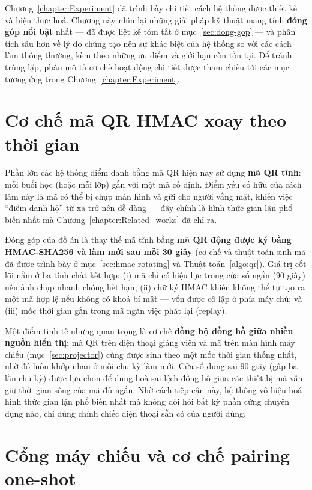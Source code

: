 \documentclass[../main.tex]{subfiles}
\begin{document}
Chương~\ref{chapter:Experiment} đã trình bày chi tiết cách hệ thống được thiết kế và hiện
thực hoá. Chương này nhìn lại những giải pháp kỹ thuật mang tính \textbf{đóng góp nổi bật}
nhất --- đã được liệt kê tóm tắt ở mục~\ref{sec:dong-gop} --- và phân tích sâu hơn về lý do
chúng tạo nên sự khác biệt của hệ thống so với các cách làm thông thường, kèm theo những ưu
điểm và giới hạn còn tồn tại. Để tránh trùng lặp, phần mô tả cơ chế hoạt động chi tiết được
tham chiếu tới các mục tương ứng trong Chương~\ref{chapter:Experiment}.

\section{Cơ chế mã QR HMAC xoay theo thời gian}
\label{sec:dg-qr}

Phần lớn các hệ thống điểm danh bằng mã QR hiện nay sử dụng \textbf{mã QR tĩnh}: mỗi buổi học
(hoặc mỗi lớp) gắn với một mã cố định. Điểm yếu cố hữu của cách làm này là mã có thể bị chụp
màn hình và gửi cho người vắng mặt, khiến việc ``điểm danh hộ'' từ xa trở nên dễ dàng --- đây
chính là hình thức gian lận phổ biến nhất mà Chương~\ref{chapter:Related_works} đã chỉ ra.

Đóng góp của đồ án là thay thế mã tĩnh bằng \textbf{mã QR động được ký bằng HMAC-SHA256 và làm
mới sau mỗi 30 giây} (cơ chế và thuật toán sinh mã đã được trình bày ở
mục~\ref{sec:hmac-rotating} và Thuật toán~\ref{algo:qr}). Giá trị cốt lõi nằm ở ba tính chất
kết hợp: (i) mã chỉ có hiệu lực trong cửa sổ ngắn (90 giây) nên ảnh chụp nhanh chóng hết hạn;
(ii) chữ ký HMAC khiến không thể tự tạo ra một mã hợp lệ nếu không có khoá bí mật --- vốn được
cô lập ở phía máy chủ; và (iii) mốc thời gian gắn trong mã ngăn việc phát lại (replay).

Một điểm tinh tế nhưng quan trọng là cơ chế \textbf{đồng bộ đồng hồ giữa nhiều nguồn hiển thị}:
mã QR trên điện thoại giảng viên và mã trên màn hình máy chiếu (mục~\ref{sec:projector}) cùng
được sinh theo một mốc thời gian thống nhất, nhờ đó luôn khớp nhau ở mỗi chu kỳ làm mới. Cửa
sổ dung sai 90 giây (gấp ba lần chu kỳ) được lựa chọn để dung hoà sai lệch đồng hồ giữa các
thiết bị mà vẫn giữ thời gian sống của mã đủ ngắn. Nhờ cách tiếp cận này, hệ thống vô hiệu hoá
hình thức gian lận phổ biến nhất mà không đòi hỏi bất kỳ phần cứng chuyên dụng nào, chỉ dùng
chính chiếc điện thoại sẵn có của người dùng.

\section{Cổng máy chiếu và cơ chế pairing one-shot}
\label{sec:dg-projector}
\end{document}
